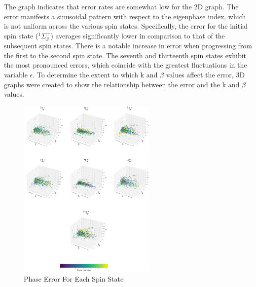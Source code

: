 \documentclass[
]{article}
\begin{document}
The graph indicates that error rates are somewhat low for the 2D graph.
The error manifests a sinusoidal pattern with respect to the eigenphase
index, which is not uniform across the various spin states.
Specifically, the error for the initial spin state
(\({}^1\Sigma_{g}^+\)) averages significantly lower in comparison to
that of the subsequent spin states. There is a notable increase in error
when progressing from the first to the second spin state. The seventh
and thirteenth spin states exhibit the most pronounced errors, which
coincide with the greatest fluctuations in the variable \(\epsilon\). To
determine the extent to which k and \(\beta\) values affect the error,
3D graphs were created to show the relationship between the error and
the k and \(\beta\) values.

\begin{figure}[H]
\centering
\caption{Phase Error For Each Spin State}
\includegraphics[width=0.6\textwidth]{tex/3D_graph.png}
\end{figure}
\end{document}
